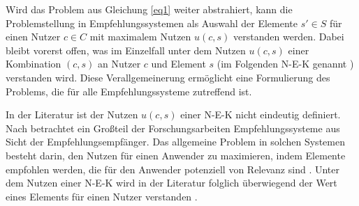 Wird das Problem aus Gleichung \ref{eq1} weiter abstrahiert, kann die Problemstellung in Empfehlungssystemen als Auswahl der Elemente $s'$$\in$$S$ für einen Nutzer $c$$\in$$C$ mit maximalem Nutzen $u(c,s)$ verstanden werden.
Dabei bleibt vorerst offen, was im Einzelfall unter dem Nutzen $u(c,s)$ einer Kombination $(c,s)$ an Nutzer $c$ und Element $s$ (im Folgenden \ac{N-E-K} genannt \cite[S. 3]{recommenderSystems:2016}) verstanden wird.
Diese Verallgemeinerung ermöglicht eine Formulierung des Problems, die für alle Empfehlungssysteme zutreffend ist.

In der Literatur ist der Nutzen $u(c,s)$ einer \ac{N-E-K} nicht eindeutig definiert.
Nach \textcite[S. 1]{jannach:article} betrachtet ein Großteil der Forschungsarbeiten Empfehlungssysteme aus Sicht der Empfehlungsempfänger.
Das allgemeine Problem in solchen Systemen besteht darin, den Nutzen für einen Anwender zu maximieren, indem Elemente empfohlen werden, die für den Anwender potenziell von Relevanz sind \cite[S. 1]{jannach:article}.
Unter dem Nutzen einer \ac{N-E-K} wird in der Literatur folglich überwiegend der Wert eines Elements für einen Nutzer verstanden \cite[S. 10f.]{ricci:inbook}\cite[S. 1]{klahold:book}\cite[S. 735]{adomavicius:inproceedings}\cite[S. 3880]{nilashi:article}.

